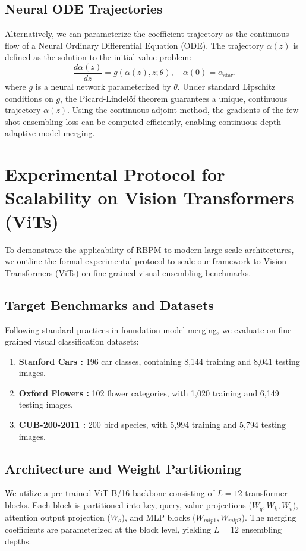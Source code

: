 \documentclass{article}
\theoremstyle{plain}
\theoremstyle{definition}
\theoremstyle{remark}
\begin{document}
\subsection{Neural ODE Trajectories}
Alternatively, we can parameterize the coefficient trajectory as the continuous flow of a Neural Ordinary Differential Equation (ODE). The trajectory $\alpha(z)$ is defined as the solution to the initial value problem:
\begin{equation}
\frac{d \alpha(z)}{dz} = g(\alpha(z), z; \theta), \quad \alpha(0) = \alpha_{\text{start}}
\end{equation}
where $g$ is a neural network parameterized by $\theta$. Under standard Lipschitz conditions on $g$, the Picard-Lindel{\"o}f theorem guarantees a unique, continuous trajectory $\alpha(z)$. Using the continuous adjoint method, the gradients of the few-shot ensembling loss can be computed efficiently, enabling continuous-depth adaptive model merging.

\section{Experimental Protocol for Scalability on Vision Transformers (ViTs)}
\label{sec:appendix_vit_experiments}

To demonstrate the applicability of RBPM to modern large-scale architectures, we outline the formal experimental protocol to scale our framework to Vision Transformers (ViTs) on fine-grained visual ensembling benchmarks.

\subsection{Target Benchmarks and Datasets}
Following standard practices in foundation model merging, we evaluate on fine-grained visual classification datasets:
\begin{enumerate}
    \item \textbf{Stanford Cars \cite{krause20133d}:} 196 car classes, containing 8,144 training and 8,041 testing images.
    \item \textbf{Oxford Flowers \cite{nilsback2008automated}:} 102 flower categories, with 1,020 training and 6,149 testing images.
    \item \textbf{CUB-200-2011 \cite{wah2011caltech}:} 200 bird species, with 5,994 training and 5,794 testing images.
\end{enumerate}

\subsection{Architecture and Weight Partitioning}
We utilize a pre-trained ViT-B/16 backbone consisting of $L = 12$ transformer blocks. Each block is partitioned into key, query, value projections ($W_q, W_k, W_v$), attention output projection ($W_o$), and MLP blocks ($W_{mlp1}, W_{mlp2}$). The merging coefficients are parameterized at the block level, yielding $L = 12$ ensembling depths.
\end{document}
